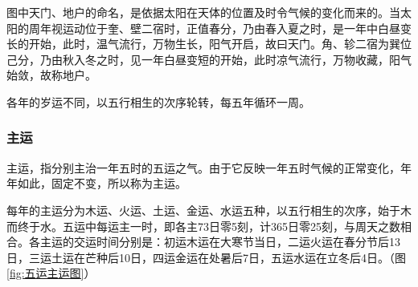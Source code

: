 \documentclass[12pt]{ctexbook}
\begin{document}
图中天门、地户的命名，是依据太阳在天体的位置及时令气候的变化而来的。当太阳的周年视运动位于奎、壁二宿时，正值春分，乃由春入夏之时，是一年中白昼变长的开始，此时，温气流行，万物生长，阳气开启，故曰天门。角、轸二宿为巽位己分，乃由秋入冬之时，见一年白昼变短的开始，此时凉气流行，万物收藏，阳气始敛，故称地户。

各年的岁运不同，以五行相生的次序轮转，每五年循环一周。

\subsubsection{主运}%

主运，指分别主治一年五时的五运之气。由于它反映一年五时气候的正常变化，年年如此，固定不变，所以称为主运。

每年的主运分为木运、火运、土运、金运、水运五种，以五行相生的次序，始于木而终于水。五运中每运主一时，即各主73日零5刻，计365日零25刻，与周天之数相合。各主运的交运时间分别是：初运木运在大寒节当日，二运火运在春分节后13日，三运土运在芒种后10日，四运金运在处暑后7日，五运水运在立冬后4日。（图\ref{fig:五运主运图}）
\end{document}
